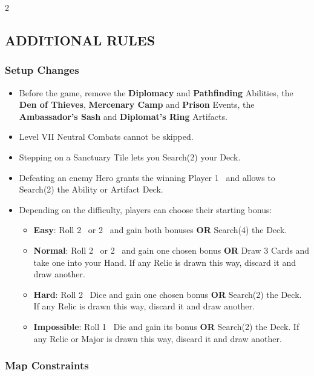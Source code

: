 \begin{multicols}{2}
\subsection*{\MakeUppercase{Additional Rules}}

\subsubsection*{Setup Changes}

\begin{itemize}
  \item Before the game, remove the \textbf{Diplomacy} and \textbf{Pathfinding} Abilities, the \textbf{Den of Thieves}, \textbf{Mercenary Camp} and \textbf{Prison} Events, the \textbf{Ambassador's Sash} and \textbf{Diplomat's Ring} Artifacts.
  \item Level VII Neutral Combats cannot be skipped.
  \item Stepping on a Sanctuary Tile lets you Search(2) your Deck.
  \item Defeating an enemy Hero grants the winning Player 1~ and allows to Search(2) the Ability or Artifact Deck.
  \item Depending on the difficulty, players can choose their starting bonus:
  \begin{itemize}
    \item \textbf{Easy}: Roll 2~ or 2~ and gain both bonuses \textbf{OR} Search(4) the  Deck.
      \item \textbf{Normal}: Roll 2~ or 2~ and gain one chosen bonus \textbf{OR} Draw 3  Cards and take one into your Hand. If any Relic is drawn this way, discard it and draw another.
      \item \textbf{Hard}: Roll 2~ Dice and gain one chosen bonus \textbf{OR} Search(2) the  Deck. If any Relic  is drawn this way, discard it and draw another.
      \item \textbf{Impossible}: Roll 1~ Die and gain its bonus \textbf{OR} Search(2) the  Deck. If any Relic or Major  is drawn this way, discard it and draw another.
    \end{itemize}
\end{itemize}

\subsubsection*{Map Constraints}


\end{multicols}
